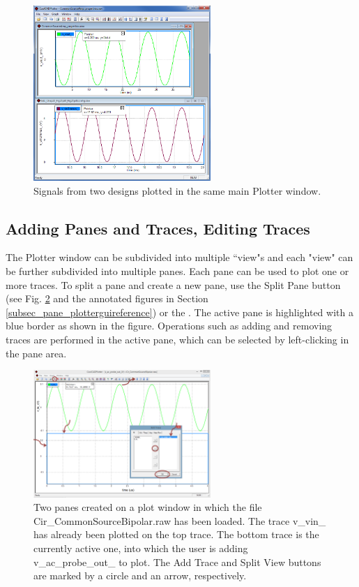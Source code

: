 \begin{figure}
    \includegraphics[width=0.6\textwidth]{./figures/plotter_netlist_editor_figures/Plotter_MultipleSubwindows.png}
    \caption{{Signals from two designs plotted in the same main Plotter window.}}
  \label{fig_plotter_multiplesubwindows}
\end{figure}

\subsection{Adding Panes and Traces, Editing Traces}
\label{subsec_pane_addingtraces}

The Plotter window can be subdivided into multiple ``view"s and each "view" can be further subdivided into multiple panes. Each pane can be used to plot one or more traces. To split a pane and create a new pane, use the \textsf{Split Pane} button (see Fig. \ref{fig_plotter_multipaneaddtrace} and the annotated figures in Section \ref{subsec_pane_plotterguireference}) or the . The active pane is highlighted with a blue border as shown in the figure.  Operations such as adding and removing traces are performed in the active pane, which can be selected by left-clicking in the pane area.   

\begin{figure}
    \includegraphics[width=0.6\textwidth]{./figures/plotter_netlist_editor_figures/Plotter_AddingTraces_MultiPane.png}
    \caption{{Two panes created on a plot window in which the file \textsf{Cir\_CommonSourceBipolar.raw} has been loaded.  The trace \textsf{v\_vin\_} has already been plotted on the top trace.  The bottom trace is the currently active one, into which the user is adding \textsf{v\_ac\_probe\_out\_} to plot.  The Add Trace and Split View buttons are marked by a circle and an arrow, respectively.}}
  \label{fig_plotter_multipaneaddtrace}
\end{figure}

